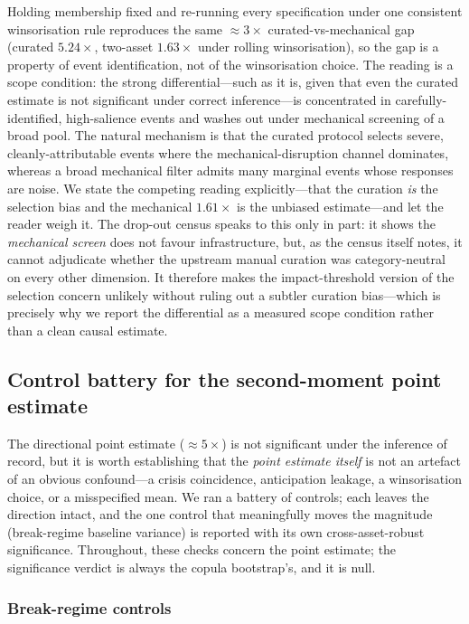 \documentclass[pdflatex,sn-mathphys-num]{sn-jnl}
\theoremstyle{thmstyleone}
\theoremstyle{thmstyletwo}
\theoremstyle{thmstylethree}
\begin{document}
Holding membership fixed and re-running every specification under one consistent winsorisation rule reproduces the same $\approx 3\times$ curated-vs-mechanical gap (curated $5.24\times$, two-asset $1.63\times$ under rolling winsorisation), so the gap is a property of event identification, not of the winsorisation choice. The reading is a scope condition: the strong differential---such as it is, given that even the curated estimate is not significant under correct inference---is concentrated in carefully-identified, high-salience events and washes out under mechanical screening of a broad pool. The natural mechanism is that the curated protocol selects severe, cleanly-attributable events where the mechanical-disruption channel dominates, whereas a broad mechanical filter admits many marginal events whose responses are noise. We state the competing reading explicitly---that the curation \emph{is} the selection bias and the mechanical $1.61\times$ is the unbiased estimate---and let the reader weigh it. The drop-out census speaks to this only in part: it shows the \emph{mechanical screen} does not favour infrastructure, but, as the census itself notes, it cannot adjudicate whether the upstream manual curation was category-neutral on every other dimension. It therefore makes the impact-threshold version of the selection concern unlikely without ruling out a subtler curation bias---which is precisely why we report the differential as a measured scope condition rather than a clean causal estimate.

\subsection{Control battery for the second-moment point estimate}\label{sec:control_battery}

The directional point estimate ($\approx 5\times$) is not significant under the inference of record, but it is worth establishing that the \emph{point estimate itself} is not an artefact of an obvious confound---a crisis coincidence, anticipation leakage, a winsorisation choice, or a misspecified mean. We ran a battery of controls; each leaves the direction intact, and the one control that meaningfully moves the magnitude (break-regime baseline variance) is reported with its own cross-asset-robust significance. Throughout, these checks concern the point estimate; the significance verdict is always the copula bootstrap's, and it is null.

\subsubsection{Break-regime controls}\label{sec:break_controls}
\end{document}
